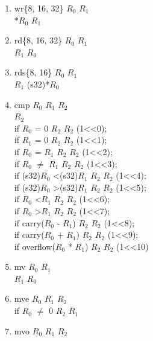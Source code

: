 \documentclass{article}
\begin{document}
\begin{enumerate}
			$R_2$ \textleftarrow \space (s32)$R_0$*(s32)$R_1$
		\item wr\{8, 16, 32\} $R_0$ $R_1$\\
			$*R_0$ \textleftarrow \space $R_1$
		\item rd\{8, 16, 32\} $R_0$ $R_1$\\
			$R_1$ \textleftarrow \space *$R_0$
		\item rds\{8, 16\} $R_0$ $R_1$\\
			$R_1$ \textleftarrow \space (s32)*$R_0$
		\newpage
		\item cmp $R_0$ $R_1$ $R_2$\\
			$R_2$ \\
			if $R_0$ = 0 $R_2$ \textleftarrow \space $R_2$ \textbar \space (1\textless\textless0);\\
			if $R_1$ = 0 $R_2$ \textleftarrow \space $R_2$ \textbar \space (1\textless\textless1);\\
			if $R_0$ = $R_1$ $R_2$ \textleftarrow \space $R_2$ \textbar \space (1\textless\textless2);\\
			if $R_0$ $\neq$ $R_1$ $R_2$ \textleftarrow \space $R_2$ \textbar \space (1\textless\textless3);\\
			if (s32)$R_0$ \textless \space (s32)$R_1$ $R_2$ \textleftarrow \space $R_2$ \textbar \space (1\textless\textless4);\\
			if (s32)$R_0$ \textgreater \space (s32)$R_1$ $R_2$ \textleftarrow \space $R_2$ \textbar \space (1\textless\textless5);\\
			if $R_0$ \textless \space $R_1$ $R_2$ \textleftarrow \space $R_2$ \textbar \space (1\textless\textless6);\\
			if $R_0$ \textgreater \space $R_1$ $R_2$ \textleftarrow \space $R_2$ \textbar \space (1\textless\textless7);\\
			if carry($R_0$ - $R_1$) $R_2$ \textleftarrow \space $R_2$ \textbar \space (1\textless\textless8);\\
			if carry($R_0$ + $R_1$) $R_2$ \textleftarrow \space $R_2$ \textbar \space (1\textless\textless9);\\
			if overflow($R_0$ * $R_1$) $R_2$ \textleftarrow \space $R_2$ \textbar \space (1\textless\textless10)
		\item mv $R_0$ $R_1$\\
			$R_1$ \textleftarrow $R_0$
		\item mve $R_0$ $R_1$ $R_2$\\
			if $R_0$ $\neq$ 0 $R_2$ \textleftarrow $R_1$
		\item mvo $R_0$ $R_1$ $R_2$\\

\end{enumerate}
\end{document}
